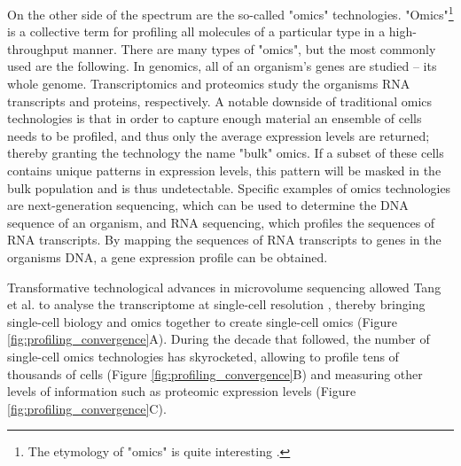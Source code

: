 On the other side of the spectrum are the so-called "omics" technologies. "Omics"\footnote{The etymology of "omics" is quite interesting \cite{yadav_wholenesssuffixomics_2007}.} is a collective term for profiling all molecules of a particular type in a high-throughput manner. There are many types of "omics", but the most commonly used are the following. In genomics, all of an organism's genes are studied -- its whole genome. Transcriptomics and proteomics study the organisms RNA transcripts and proteins, respectively. A notable downside of traditional omics technologies is that in order to capture enough material an ensemble of cells needs to be profiled, and thus only the average expression levels are returned; thereby granting the technology the name "bulk" omics. If a subset of these cells contains unique patterns in expression levels, this pattern will be masked in the bulk population and is thus undetectable. Specific examples of omics technologies are next-generation sequencing, which can be used to determine the DNA sequence of an organism, and RNA sequencing, which profiles the sequences of RNA transcripts. By mapping the sequences of RNA transcripts to genes in the organisms DNA, a gene expression profile can be obtained.

Transformative technological advances in microvolume sequencing allowed Tang et al. to analyse the transcriptome at single-cell resolution \cite{tang_mrnaseqwholetranscriptomeanalysis_2009}, thereby bringing single-cell biology and omics together to create single-cell omics (Figure \ref{fig:profiling_convergence}A). During the decade that followed, the number of single-cell omics technologies has skyrocketed, allowing to profile tens of thousands of cells (Figure \ref{fig:profiling_convergence}B) and measuring other levels of information such as proteomic expression levels (Figure \ref{fig:profiling_convergence}C).

